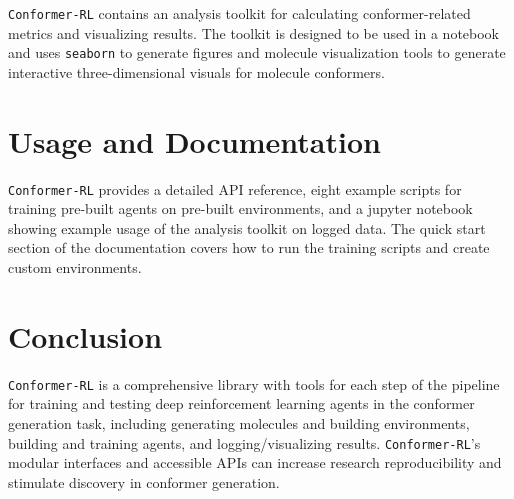 \documentclass[twoside,11pt]{article}
\newcommand{\code}[1]{\texttt{#1}}
\newcommand{\titleofpaper}{Conformer-RL}
\begin{document}
\code{\titleofpaper} contains an analysis toolkit for calculating conformer-related metrics and visualizing results. The toolkit is designed to be used in a notebook and uses \code{seaborn} \citep{waskom2021seaborn} to generate figures and molecule visualization tools to generate interactive three-dimensional visuals for molecule conformers.

\section{Usage and Documentation}
\code{\titleofpaper} provides a detailed API reference, eight example scripts for training pre-built agents on pre-built environments, and a jupyter notebook showing example usage of the analysis toolkit on logged data. The quick start section of the documentation covers how to run the training scripts and create custom environments.

\section{Conclusion}
\code{\titleofpaper} is a comprehensive library with tools for each step of the pipeline for training and testing deep reinforcement learning agents in the conformer generation task, including generating molecules and building environments, building and training agents, and logging/visualizing results. \code{\titleofpaper}'s modular interfaces and accessible APIs can increase research reproducibility and stimulate discovery in conformer generation.



\newpage


\vskip 0.2in




\newpage

\end{document}
